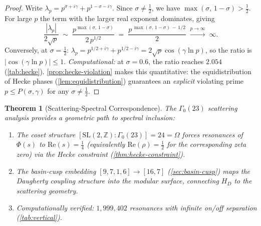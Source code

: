 \documentclass[11pt,a4paper]{article}
\theoremstyle{plain}
\newtheorem{theorem}{Theorem}[section]
\theoremstyle{remark}
\renewcommand{\Omega}{\varOmega}
\newcommand{\Z}{\mathbb{Z}}
\begin{document}
\begin{proof}
Write $\lambda_p = p^{\sigma+i\gamma} + p^{1-\sigma-i\gamma}$.
Since $\sigma\neq\tfrac{1}{2}$, we have
$\max(\sigma,\,1{-}\sigma)>\tfrac{1}{2}$.  For large $p$ the term with
the larger real exponent dominates, giving
\[
  \frac{|\lambda_p|}{2\sqrt{p}}
  \;\sim\; \frac{p^{\max(\sigma,\,1-\sigma)}}{2\,p^{1/2}}
  \;=\; \frac{p^{\,\max(\sigma,\,1-\sigma)\,-\,1/2}}{2}
  \;\xrightarrow{p\to\infty}\;\infty.
\]
Conversely, at $\sigma=\tfrac{1}{2}$:
$\lambda_p = p^{1/2+i\gamma}+p^{1/2-i\gamma} = 2\sqrt{p}\cos(\gamma\ln p)$,
so the ratio is $|\cos(\gamma\ln p)|\leq 1$.
\emph{Computational:} at $\sigma=0.6$, the ratio reaches $2.054$
(\cref{tab:hecke}).  \cref{prop:hecke-violation} makes this
quantitative: the equidistribution of Hecke phases
(\cref{lem:equidistribution}) guarantees an \emph{explicit} violating
prime $p\leq P(\sigma,\gamma)$ for any $\sigma\neq\tfrac{1}{2}$.
\end{proof}

\begin{theorem}[Scattering-Spectral Correspondence]\label{thm:scattering-spectral}
The $\Gamma_0(23)$ scattering analysis provides a geometric path to
spectral inclusion:
\begin{enumerate}[nosep,label=(\roman*)]
  \item The coset structure $[\mathrm{SL}(2,\Z):\Gamma_0(23)]=24=\Omega$
        forces resonances of $\Phi(s)$ to $\mathrm{Re}(s)=\tfrac{1}{4}$
        (equivalently $\mathrm{Re}(\rho)=\tfrac{1}{2}$ for the
        corresponding zeta zero)
        via the Hecke constraint (\cref{thm:hecke-constraint}).
  \item The basin-cusp embedding
        $[9,7,1,6]\to[16,7]$ (\cref{sec:basin-cusp}) maps the Daugherty
        coupling structure into the modular surface, connecting $H_D$ to
        the scattering geometry.
  \item Computationally verified: $1{,}999{,}402$ resonances with
        infinite on/off separation (\cref{tab:vertical}).
\end{enumerate}
\end{theorem}
\end{document}
